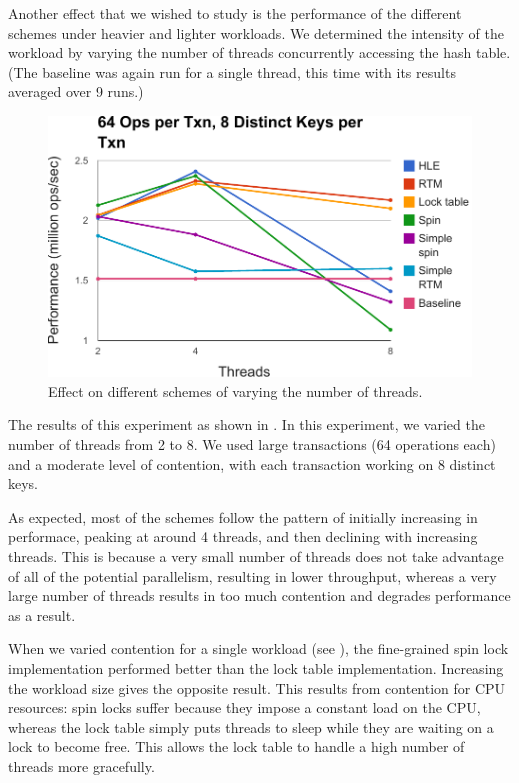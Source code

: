 Another effect that we wished to study is the performance of the different
schemes under heavier and lighter workloads. We determined the intensity of the
workload by varying the number of threads concurrently accessing the hash
table. (The baseline was again run for a single thread, this time with its
results averaged over 9 runs.)

\begin{figure}[h!]
  \centering
  \includegraphics[scale=0.575]{figure/threads.pdf}
  \caption{Effect on different schemes of varying the number of threads.}
  \label{fig:threads} 
\end{figure}

The results of this experiment as shown in . In this
experiment, we varied the number of threads from 2 to 8. We used large
transactions (64 operations each) and a moderate level of contention, with each
transaction working on 8 distinct keys.

As expected, most of the schemes follow the pattern of initially increasing in
performace, peaking at around 4 threads, and then declining with increasing
threads. This is because a very small number of threads does not take advantage
of all of the potential parallelism, resulting in lower throughput, whereas a
very large number of threads results in too much contention and degrades
performance as a result.

When we varied contention for a single workload (see ), the
fine-grained spin lock implementation performed better than the lock table
implementation. Increasing the workload size gives the opposite result. This
results from contention for CPU resources: spin locks suffer because they impose
a constant load on the CPU, whereas the lock table simply puts threads to sleep
while they are waiting on a lock to become free. This allows the lock table to
handle a high number of threads more gracefully.

